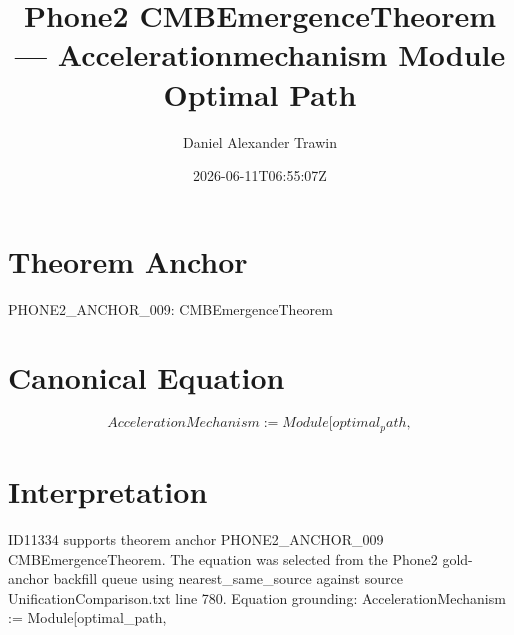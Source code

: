 \documentclass[11pt]{article}
\title{Phone2 CMBEmergenceTheorem — Accelerationmechanism Module Optimal Path}
\author{Daniel Alexander Trawin}
\date{2026-06-11T06:55:07Z}
\begin{document}
\maketitle
\section*{Theorem Anchor}
PHONE2_ANCHOR_009: CMBEmergenceTheorem
\section*{Canonical Equation}
\[
AccelerationMechanism := Module[{optimal_path},
\]
\section*{Interpretation}
ID11334 supports theorem anchor PHONE2_ANCHOR_009 CMBEmergenceTheorem. The equation was selected from the Phone2 gold-anchor backfill queue using nearest_same_source against source UnificationComparison.txt line 780. Equation grounding: AccelerationMechanism := Module[{optimal_path},
\end{document}
